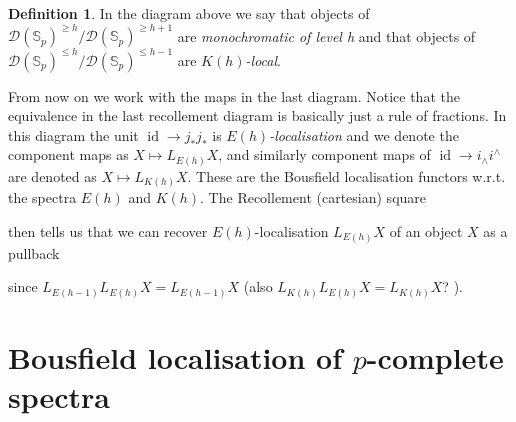 \documentclass[a4paper]{article} %
\theoremstyle{definition}
\newtheorem{definition}[theorem]{Definition}
\newcommand{\Spp}{\mathcal{D}(\mathbb{S}_p)}
\begin{document}
\begin{definition}
In the diagram above we say that objects of $\Spp^{\ge h}/\Spp^{\ge h+1}$ are \textit{monochromatic of level h} and that objects of $\Spp^{\le h}/\Spp^{\le h-1}$ are $K(h)$\textit{-local}.
\end{definition}
From now on we work with the maps in the last diagram. Notice that the equivalence in the last recollement diagram is basically just a rule of fractions. In this diagram the unit $\operatorname{id} \to j_*j_*$ is $E(h)$\textit{-localisation} and we denote the component maps as $X \mapsto L_{E(h)}X$, and similarly component maps of $\operatorname{id} \to i_\wedge i^\wedge$ are denoted as $X \mapsto L_{K(h)}X$. These are the Bousfield localisation functors w.r.t. the spectra $E(h)$ and $K(h)$. The Recollement (cartesian) square
\begin{center}
\end{center}
then tells us that we can recover $E(h)$-localisation $L_{E(h)}X$ of an object $X$ as a pullback
\begin{center}
\end{center}
since $L_{E(h-1)}L_{E(h)}X = L_{E(h-1)}X$ (also $L_{K(h)}L_{E(h)}X = L_{K(h)}X$? ).

\section{Bousfield localisation of $p$-complete spectra}
\end{document}
